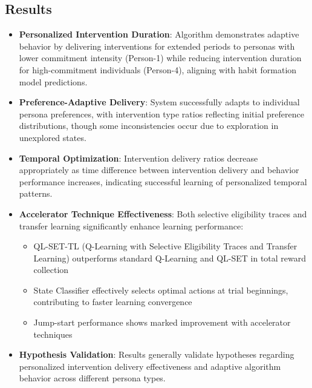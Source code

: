 \subsection*{Results}
\begin{itemize}
    \item \textbf{Personalized Intervention Duration}: Algorithm demonstrates adaptive behavior by delivering interventions for extended periods to personas with lower commitment intensity (Person-1) while reducing intervention duration for high-commitment individuals (Person-4), aligning with habit formation model predictions.
    \item \textbf{Preference-Adaptive Delivery}: System successfully adapts to individual persona preferences, with intervention type ratios reflecting initial preference distributions, though some inconsistencies occur due to exploration in unexplored states.
    \item \textbf{Temporal Optimization}: Intervention delivery ratios decrease appropriately as time difference between intervention delivery and behavior performance increases, indicating successful learning of personalized temporal patterns.
    \item \textbf{Accelerator Technique Effectiveness}: Both selective eligibility traces and transfer learning significantly enhance learning performance:
    \begin{itemize}
        \item QL-SET-TL (Q-Learning with Selective Eligibility Traces and Transfer Learning) outperforms standard Q-Learning and QL-SET in total reward collection
        \item State Classifier effectively selects optimal actions at trial beginnings, contributing to faster learning convergence
        \item Jump-start performance shows marked improvement with accelerator techniques
    \end{itemize}
    \item \textbf{Hypothesis Validation}: Results generally validate hypotheses regarding personalized intervention delivery effectiveness and adaptive algorithm behavior across different persona types.
\end{itemize}

